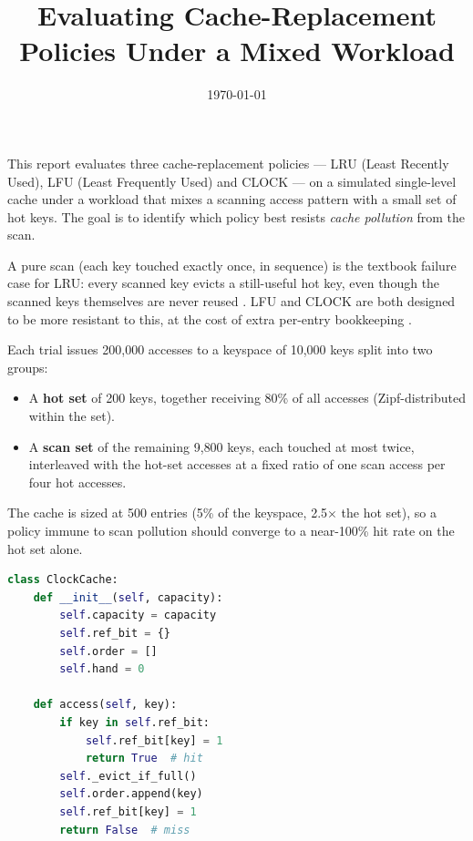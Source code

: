\documentclass[lstlisting]{hebdomon}
\title{Evaluating Cache-Replacement Policies Under a Mixed Workload}
\date{\today}
\begin{document}
\maketitle
\tableofcontents


This report evaluates three cache-replacement policies --- LRU
(Least Recently Used), LFU (Least Frequently Used) and CLOCK --- on a
simulated single-level cache under a workload that mixes a scanning
access pattern with a small set of hot keys. The goal is to identify
which policy best resists \emph{cache pollution} from the scan.


A pure scan (each key touched exactly once, in sequence) is the
textbook failure case for LRU: every scanned key evicts a
still-useful hot key, even though the scanned keys themselves are
never reused \parencite{belady1966}. LFU and CLOCK are both designed
to be more resistant to this, at the cost of extra per-entry
bookkeeping \parencite{orourke1990}.



Each trial issues 200{,}000 accesses to a keyspace of 10{,}000 keys
split into two groups:

\begin{itemize}
    \item A \textbf{hot set} of 200 keys, together receiving 80\% of
    all accesses (Zipf-distributed within the set).
    \item A \textbf{scan set} of the remaining 9{,}800 keys, each
    touched at most twice, interleaved with the hot-set accesses at a
    fixed ratio of one scan access per four hot accesses.
\end{itemize}

The cache is sized at 500 entries (5\% of the keyspace, 2.5$\times$
the hot set), so a policy immune to scan pollution should converge to
a near-100\% hit rate on the hot set alone.


\begin{lstlisting}[language=Python,caption={CLOCK eviction core}]
class ClockCache:
    def __init__(self, capacity):
        self.capacity = capacity
        self.ref_bit = {}
        self.order = []
        self.hand = 0

    def access(self, key):
        if key in self.ref_bit:
            self.ref_bit[key] = 1
            return True  # hit
        self._evict_if_full()
        self.order.append(key)
        self.ref_bit[key] = 1
        return False  # miss
\end{lstlisting}
\end{document}
